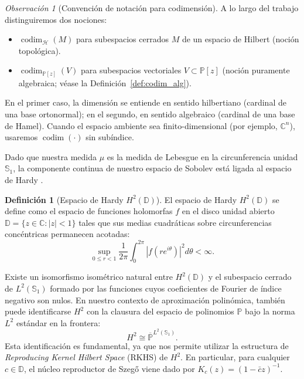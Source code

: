 \documentclass[12pt,a4paper]{article}
\theoremstyle{definition}
\newtheorem{definition}{Definición}
\theoremstyle{remark}
\newtheorem{remark}{Observación}
\newcommand{\C}{\mathbb{C}}
\newcommand{\Poly}{\mathbb{P}[z]}
\newcommand{\abs}[1]{\left| #1 \right|}
\begin{document}
\begin{remark}[Convención de notación para codimensión]\label{rem:convencion_codim}
  A lo largo del trabajo distinguiremos dos nociones:
  \begin{itemize}
    \item $\operatorname{codim}_{\mathcal{H}}(M)$ para subespacios cerrados $M$ de un espacio de Hilbert (noción topológica).
    \item $\operatorname{codim}_{\Poly}(V)$ para subespacios vectoriales $V\subset \Poly$ (noción puramente algebraica; véase la Definición~\ref{def:codim_alg}).
  \end{itemize}
  En el primer caso, la dimensión se entiende en sentido hilbertiano (cardinal de una base ortonormal); en el segundo, en sentido algebraico (cardinal de una base de Hamel).
  Cuando el espacio ambiente sea finito-dimensional (por ejemplo, $\mathbb{C}^n$), usaremos $\operatorname{codim}(\cdot)$ sin subíndice.
\end{remark}

Dado que nuestra medida $\mu$ es la medida de Lebesgue en la circunferencia unidad $\mathbb{S}_1$, la componente continua de nuestro espacio de Sobolev está ligada al espacio de Hardy \cite{duren1970theory}.

\begin{definition}[Espacio de Hardy $H^2(\mathbb{D})$]
  El espacio de Hardy $H^2(\mathbb{D})$ se define como el espacio de funciones holomorfas $f$ en el disco unidad abierto $\mathbb{D} = \{z \in \C : \abs{z} < 1\}$ tales que sus medias cuadráticas sobre circunferencias concéntricas permanecen acotadas:
  $$ \sup_{0 \le r < 1} \frac{1}{2\pi} \int_{0}^{2\pi} \abs{f(re^{i\theta})}^2 d\theta < \infty. $$
\end{definition}

Existe un isomorfismo isométrico natural entre $H^2(\mathbb{D})$ y el subespacio cerrado de $L^2(\mathbb{S}_1)$ formado por las funciones cuyos coeficientes de Fourier de índice negativo son nulos. En nuestro contexto de aproximación polinómica, también puede identificarse $H^2$ con la clausura del espacio de polinomios $\mathbb{P}$ bajo la norma $L^2$ estándar en la frontera:
$$ H^2 \cong \overline{\mathbb{P}}^{L^2(\mathbb{S}_1)}. $$
Esta identificación es fundamental, ya que nos permite utilizar la estructura de \textit{Reproducing Kernel Hilbert Space} (RKHS) de $H^2$. En particular, para cualquier $c \in \mathbb{D}$, el núcleo reproductor de Szegő viene dado por $K_c(z) = (1-\bar{c}z)^{-1}$.
\end{document}
